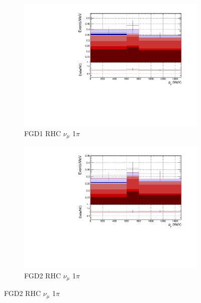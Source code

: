 \begin{figure}[!htbp]
\begin{subfigure}{0.49\textwidth}
  \centering
  \includegraphics[width=\textwidth]{figs/FGD1_NuMuBkg_CC1pi_in_AntiNu_Mode_p}
  \caption{FGD1 RHC $\nu_{\mu}$ 1$\pi$}
\end{subfigure}
\begin{subfigure}{0.49\textwidth}
  \centering
  \includegraphics[width=\textwidth]{figs/FGD2_NuMuBkg_CC1pi_in_AntiNu_Mode_p}
  \caption{FGD2 RHC $\nu_{\mu}$ 1$\pi$}
\end{subfigure}


\end{figure}

